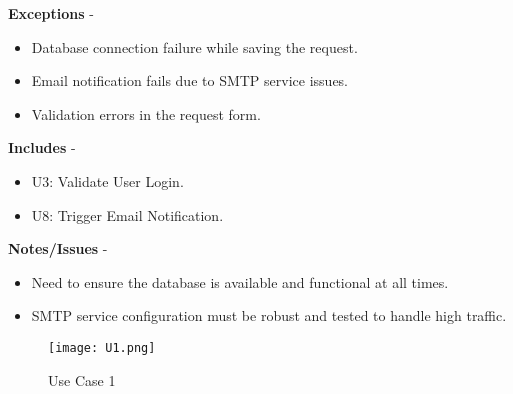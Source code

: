 \documentclass[a4paper,12pt]{article}
\begin{document}
\textbf{Exceptions} - 
\begin{itemize} 
    \item Database connection failure while saving the request.
    \item Email notification fails due to SMTP service issues.
    \item Validation errors in the request form.
\end{itemize}
\textbf{Includes} - 
\begin{itemize} 
    \item U3: Validate User Login.
    \item U8: Trigger Email Notification.
\end{itemize}
\textbf{Notes/Issues} - 
\begin{itemize} 
    \item Need to ensure the database is available and functional at all times.
    \item SMTP service configuration must be robust and tested to handle high traffic.
\end{itemize}
\begin{figure}[h!]
    \centering
    \texttt{[image: U1.png]} 
    \caption{Use Case 1}
    \label{Figure 3: Use Case 1}
\end{figure}
\newpage
\end{document}
